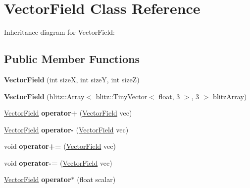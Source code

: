 \hypertarget{classVectorField}{\section{Vector\+Field Class Reference}
\label{classVectorField}
}


Inheritance diagram for Vector\+Field\+:
\subsection*{Public Member Functions}
\begin{DoxyCompactItemize}
\item 
\hypertarget{classVectorField_adc433255e4e8e40d7c4c4ab19af8a05e}{{\bfseries Vector\+Field} (int size\+X, int size\+Y, int size\+Z)}\label{classVectorField_adc433255e4e8e40d7c4c4ab19af8a05e}

\item 
\hypertarget{classVectorField_a66395f8f546e1465bf917bc450b36624}{{\bfseries Vector\+Field} (blitz\+::\+Array$<$ blitz\+::\+Tiny\+Vector$<$ float, 3 $>$, 3 $>$ blitz\+Array)}\label{classVectorField_a66395f8f546e1465bf917bc450b36624}

\item 
\hypertarget{classVectorField_a11296502199ca582bbf2123ab6227420}{\hyperlink{classVectorField}{Vector\+Field} {\bfseries operator+} (\hyperlink{classVectorField}{Vector\+Field} vec)}\label{classVectorField_a11296502199ca582bbf2123ab6227420}

\item 
\hypertarget{classVectorField_a6969a87035138439bd67b101f2e9182f}{\hyperlink{classVectorField}{Vector\+Field} {\bfseries operator-\/} (\hyperlink{classVectorField}{Vector\+Field} vec)}\label{classVectorField_a6969a87035138439bd67b101f2e9182f}

\item 
\hypertarget{classVectorField_ac62075e72b02bd5bac1e085c734224f0}{void {\bfseries operator+=} (\hyperlink{classVectorField}{Vector\+Field} vec)}\label{classVectorField_ac62075e72b02bd5bac1e085c734224f0}

\item 
\hypertarget{classVectorField_a61b338d2871ce4a69e5e040a89317d4c}{void {\bfseries operator-\/=} (\hyperlink{classVectorField}{Vector\+Field} vec)}\label{classVectorField_a61b338d2871ce4a69e5e040a89317d4c}

\item 
\hypertarget{classVectorField_a97510075549e948e6d54dc2551743d68}{\hyperlink{classVectorField}{Vector\+Field} {\bfseries operator$\ast$} (float scalar)}\label{classVectorField_a97510075549e948e6d54dc2551743d68}


\end{DoxyCompactItemize}
